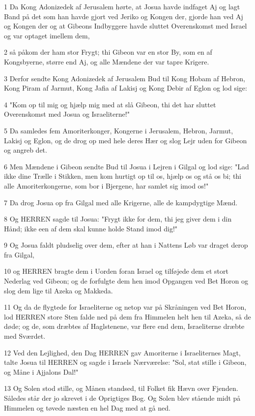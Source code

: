 \par 1 Da Kong Adonizedek af Jerusalem hørte, at Josua havde indfaget Aj og lagt Band på det som han havde gjort ved Jeriko og Kongen der, gjorde han ved Aj og Kongen der og at Gibeons Indbyggere havde sluttet Overenskomst med Israel og var optaget imellem dem,
\par 2 så påkom der ham stor Frygt; thi Gibeon var en stor By, som en af Kongsbyerne, større end Aj, og alle Mændene der var tapre Krigere.
\par 3 Derfor sendte Kong Adonizedek af Jerusalem Bud til Kong Hobam af Hebron, Kong Piram af Jarmut, Kong Jafia af Lakisj og Kong Debir af Eglon og lod sige:
\par 4 "Kom op til mig og hjælp mig med at slå Gibeon, thi det har sluttet Overenskomst med Josua og Israeliterne!"
\par 5 Da samledes fem Amoriterkonger, Kongerne i Jerusalem, Hebron, Jarmut, Lakisj og Eglon, og de drog op med hele deres Hær og slog Lejr uden for Gibeon og angreb det.
\par 6 Men Mændene i Gibeon sendte Bud til Josua i Lejren i Gilgal og lod sige: "Lad ikke dine Trælle i Stikken, men kom hurtigt op til os, hjælp os og stå os bi; thi alle Amoriterkongerne, som bor i Bjergene, har samlet sig imod os!"
\par 7 Da drog Josua op fra Gilgal med alle Krigerne, alle de kampdygtige Mænd.
\par 8 Og HERREN sagde til Josua: "Frygt ikke for dem, thi jeg giver dem i din Hånd; ikke een af dem skal kunne holde Stand imod dig!"
\par 9 Og Josua faldt pludselig over dem, efter at han i Nattens Løb var draget derop fra Gilgal,
\par 10 og HERREN bragte dem i Uorden foran Israel og tilføjede dem et stort Nederlag ved Gibeon; og de forfulgte dem hen imod Opgangen ved Bet Horon og slog dem lige til Azeka og Makkeda.
\par 11 Og da de flygtede for Israeliterne og netop var på Skråningen ved Bet Horon, lod HERREN store Sten falde ned på dem fra Himmelen helt hen til Azeka, så de døde; og de, som dræbtes af Haglstenene, var flere end dem, Israeliterne dræbte med Sværdet.
\par 12 Ved den Lejlighed, den Dag HERREN gav Amoriterne i Israeliternes Magt, talte Josua til HERREN og sagde i Israels Nærværelse: "Sol, stat stille i Gibeon, og Måne i Ajjalons Dal!"
\par 13 Og Solen stod stille, og Månen standsed, til Folket fik Hævn over Fjenden. Således står der jo skrevet i de Oprigtiges Bog. Og Solen blev stående midt på Himmelen og tøvede næsten en hel Dag med at gå ned.

